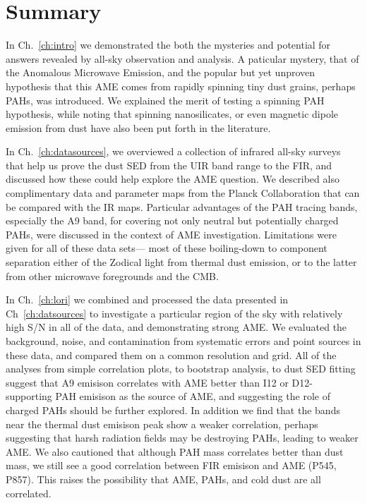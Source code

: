 \chapter{Summary}
  \label{ch:Summary}

  In Ch.~\ref{ch:intro} we demonstrated the both the mysteries and potential for answers revealed by all-sky observation and analysis. A paticular mystery, that of the Anomalous Microwave Emission, and the popular but yet unproven hypothesis that this AME comes from rapidly spinning tiny dust grains, perhaps PAHs, was introduced. We explained the merit of testing a spinning PAH hypothesis, while noting that spinning nanosilicates, or even magnetic dipole emission from dust have also been put forth in the literature.

  In Ch.~\ref{ch:datasources}, we overviewed a collection of infrared all-sky surveys that help us prove the dust SED from the UIR band range to the FIR, and discussed how these could help explore the AME question. We described also complimentary data and parameter maps from the Planck Collaboration that can be compared with the IR maps. Particular advantages of the PAH tracing bands, especially the A9 band, for covering not only neutral but potentially charged PAHs, were discussed in the context of AME investigation. Limitations were given for all of these data sets--- most of these boiling-down to component separation either of the Zodical light from thermal dust emission, or to the latter from other microwave foregrounds and the CMB.

  In Ch.~\ref{ch:lori} we combined and processed the data presented in Ch~\ref{ch:datsources} to investigate a particular region of the sky with relatively high S/N in all of the data, and demonstrating strong AME. We evaluated the background, noise, and contamination from systematic errors and point sources in these data, and compared them on a common resolution and grid. All of the analyses from simple correlation plots, to bootstrap analysis, to dust SED fitting suggest that A9 emisison correlates with AME better than I12 or D12- supporting PAH emisison as the source of AME, and suggesting the role of charged PAHs should be further explored. In addition we find that the bands near the thermal dust emisison peak show a weaker correlation, perhaps suggesting that harsh radiation fields may be destroying PAHs, leading to weaker AME. We also cautioned that although PAH mass correlates better than dust mass, we still see a good correlation between FIR emisison and AME (P545, P857). This raises the possibility that AME, PAHs, and cold dust are all correlated.

